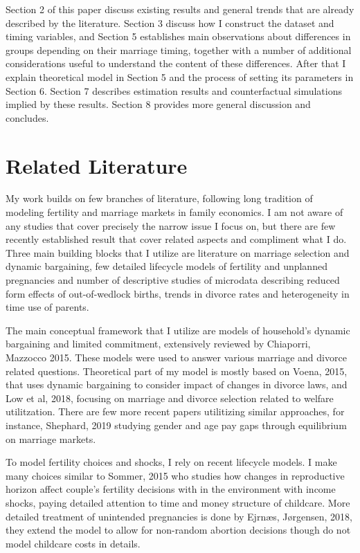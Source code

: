 \documentclass[12pt,letter]{article}
\begin{document}
Section 2 of this paper discuss existing results and general trends that are already described by the literature. Section 3 discuss how I construct the dataset and timing variables, and Section 5 establishes main observations about differences in groups depending on their marriage timing, together with a number of additional considerations useful to understand the content of these differences. After that I explain theoretical model in Section 5 and the process of setting its parameters in Section 6. Section 7 describes estimation results and counterfactual simulations implied by these results. Section 8 provides more general discussion and concludes.

\section{Related Literature}

My work builds on few branches of literature, following long tradition of modeling fertility and marriage markets in family economics. I am not aware of any studies that cover precisely the narrow issue I focus on, but there are few recently established result that cover related aspects and compliment what I do. Three main building blocks that I utilize are literature on marriage selection and dynamic bargaining, few detailed lifecycle models of fertility and unplanned pregnancies and number of descriptive studies of microdata describing reduced form effects of out-of-wedlock births, trends in divorce rates and heterogeneity in time use of parents.

The main conceptual framework that I utilize are models of household's dynamic bargaining and limited commitment, extensively reviewed by Chiaporri, Mazzocco 2015.\nocite{chiappori-review} These models were used to answer various marriage and divorce related questions. Theoretical part of my model is mostly based on Voena, 2015\nocite{voena-1}, that uses dynamic bargaining to consider impact of changes in divorce laws, and Low et al, 2018\nocite{low-1}, focusing on marriage and divorce selection related to welfare utilitzation. There are few more recent papers utilitizing similar approaches, for instance, Shephard, 2019\nocite{shephard} studying gender and age pay gaps through equilibrium on marriage markets. 

To model fertility choices and shocks, I rely on recent lifecycle models. I make many choices similar to Sommer, 2015\nocite{sommer} who studies how changes in reproductive horizon affect couple's fertility decisions with in the environment with income shocks, paying detailed attention to time and money structure of childcare. More detailed treatment of unintended pregnancies is done by Ejrnæs, Jørgensen, 2018\nocite{ejrnaes}, they extend the model to allow for non-random abortion decisions though do not model childcare costs in details. 
\end{document}
